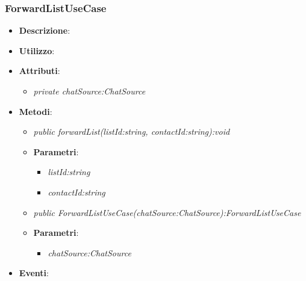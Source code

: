 \subsubsection{ForwardListUseCase}
\begin{itemize}
\item \textbf{Descrizione}: 
\item \textbf{Utilizzo}:
\item \textbf{Attributi}: 
	\begin{itemize}
	\item \textit{private chatSource:ChatSource}\\
	
	\end{itemize}
\item \textbf{Metodi}:
	\begin{itemize}
	\item \textit{public forwardList(listId:string, contactId:string):void}\\
	
			\item{\textbf{Parametri}: \begin{itemize}
			\item \textit{listId:string}\\
			
			\item \textit{contactId:string}\\
	
			\end{itemize}}
	\item \textit{public ForwardListUseCase(chatSource:ChatSource):ForwardListUseCase}\\

			\item{\textbf{Parametri}: \begin{itemize}
			\item \textit{chatSource:ChatSource}\\

			\end{itemize}}
	\end{itemize}
\item \textbf{Eventi}:
\end{itemize}

